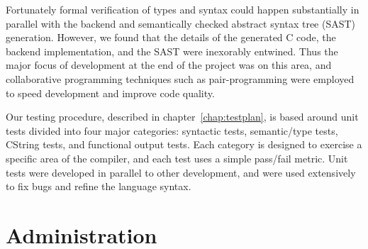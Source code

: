 Fortunately formal verification of types and syntax could happen substantially in parallel
with the backend and semantically checked abstract syntax tree (SAST) generation. However, we found
that the details of the generated C code, the backend implementation, and the SAST were
inexorably entwined. Thus the major focus of development at the end of the project was on
this area, and collaborative programming techniques such as pair-programming were employed to
speed development and improve code quality.

Our testing procedure, described in chapter~\ref{chap:testplan}, is based around unit tests
divided into four major categories: syntactic tests, semantic/type tests, CString tests, and
functional output tests. Each category is designed to exercise a specific area of the \sys{}
compiler, and each test uses a simple pass/fail metric. Unit tests were developed in parallel
to other development, and were used extensively to fix bugs and refine the language syntax.

\section{Administration}

